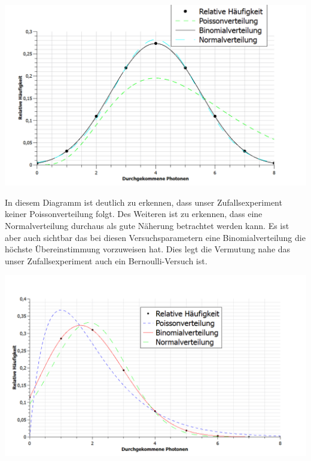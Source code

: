 \begin{center}
	\includegraphics{IMAGE/1ST-P50}
\end{center}

In diesem Diagramm ist deutlich zu erkennen, dass unser Zufallsexperiment keiner Poissonverteilung folgt. Des Weiteren ist zu erkennen, dass eine Normalverteilung durchaus als gute Näherung betrachtet werden kann. Es ist aber auch sichtbar das bei diesen Versuchsparametern eine Binomialverteilung die höchste Übereinstimmung vorzuweisen hat. Dies legt die Vermutung nahe das unser Zufallsexperiment auch ein Bernoulli-Versuch ist.

\begin{center}
	\includegraphics{IMAGE/5ST-P75}
\end{center}

